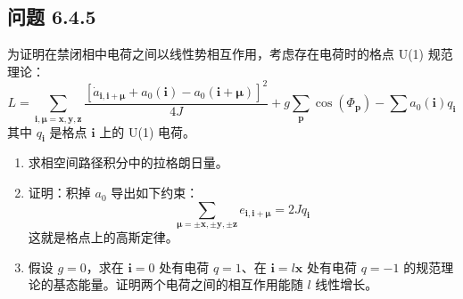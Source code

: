 \subsection*{问题 6.4.5}

为证明在禁闭相中电荷之间以线性势相互作用，考虑存在电荷时的格点 U(1) 规范理论：
\begin{equation*}
L=\sum_{\pmb{i},\pmb{\mu}=\pmb{x},\pmb{y},\pmb{z}}\frac{\left[\dot{a}_{\pmb{i},\pmb{i}+\pmb{\mu}}+a_{0}(\pmb{i})-a_{0}(\pmb{i}+\pmb{\mu})\right]^{2}}{4J}+g\sum_{\pmb{p}}\cos(\Phi_{\pmb{p}})-\sum a_{0}(\pmb{i})q_{\pmb{i}}
\end{equation*}
其中 $q_{\pmb{i}}$ 是格点 $\pmb{i}$ 上的 U(1) 电荷。
\begin{enumerate}
\item[(a)] 求相空间路径积分中的拉格朗日量。
\item[(b)] 证明：积掉 $a_{0}$ 导出如下约束：
\begin{equation*}
\sum_{\pmb{\mu}=\pm\pmb{x},\pm\pmb{y},\pm\pmb{z}}e_{\pmb{i},\pmb{i}+\pmb{\mu}}=2Jq_{\pmb{i}}
\end{equation*}
这就是格点上的高斯定律。
\item[(c)] 假设 $g=0$，求在 $\pmb{i}=0$ 处有电荷 $q=1$、在 $\pmb{i}=l\pmb{x}$ 处有电荷 $q=-1$ 的规范理论的基态能量。证明两个电荷之间的相互作用能随 $l$ 线性增长。
\end{enumerate}
